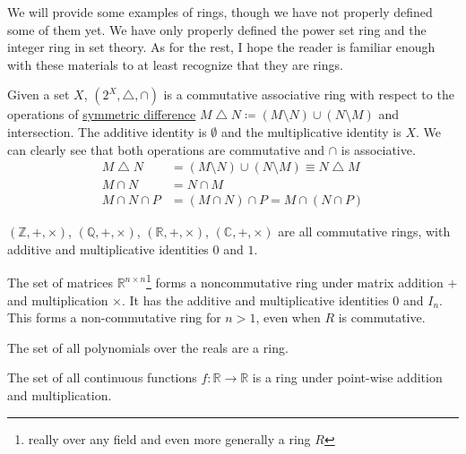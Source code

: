   We will provide some examples of rings, though we have not properly defined some of them yet. We have only properly defined the power set ring and the integer ring in set theory. As for the rest, I hope the reader is familiar enough with these materials to at least recognize that they are rings. 

  \begin{example}
    \label{ex:power-set}
    Given a set $X$, $(2^X, \bigtriangleup, \cap)$ is a commutative associative ring with respect to the operations of \hyperref[st-def:symmetric-difference]{symmetric difference} $M \bigtriangleup N \coloneqq (M \setminus N) \cup (N \setminus M)$ and intersection. The additive identity is $\emptyset$ and the multiplicative identity is $X$. We can clearly see that both operations are commutative and $\cap$ is associative. 
    \begin{align*}
      M \bigtriangleup N & = (M \setminus N) \cup (N \setminus M) \equiv N \bigtriangleup M \\
      M \cap N & = N \cap M \\
      M \cap N \cap P & = (M \cap N) \cap P = M \cap (N \cap P)
    \end{align*}
  \end{example}

  \begin{example}
    \label{ex:number-systems}
    $(\mathbb{Z}, +, \times)$, $(\mathbb{Q}, +, \times)$, $(\mathbb{R}, +, \times)$, $(\mathbb{C}, +, \times)$ are all commutative rings, with additive and multiplicative identities $0$ and $1$. 
  \end{example}

  \begin{example}
    \label{ex:matrix-rings}
    The set of matrices $\mathbb{R}^{n \times n}$\footnote{really over any field and even more generally a ring $R$} forms a noncommutative ring under matrix addition $+$ and multiplication $\times$. It has the additive and multiplicative identities $0$ and $I_{n}$. This forms a non-commutative ring for $n > 1$, even when $R$ is commutative.
  \end{example}

  \begin{example}[Polynomials]
    \label{ex:polynomials}
    The set of all polynomials over the reals are a ring. 
  \end{example}

  \begin{example}
    \label{ex:continuous-functions}
    The set of all continuous functions $f: \mathbb{R} \rightarrow \mathbb{R}$ is a ring under point-wise addition and multiplication. 
  \end{example}

